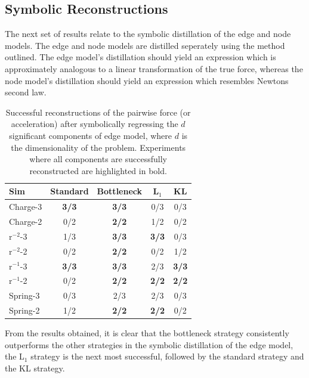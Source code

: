 \documentclass[11pt]{article}
\begin{document}
\subsection{Symbolic Reconstructions}
The next set of results relate to the symbolic distillation of the edge and node models. The edge and node models are distilled seperately using the method outlined. The edge model's distillation should yield an expression which is approximately analogous to a linear transformation of the true force, whereas the node model's distillation should yield an expression which resembles Newtons second law.
\begin{table}[H]
        \centering
        \begin{tabular}{lcccc}
        \hline
        Sim & Standard & Bottleneck & L$_1$ & KL \\
        \hline
        Charge-3 & \textbf{3/3} & \textbf{3/3} & 0/3 & 0/3 \\
        Charge-2 & 0/2 & \textbf{2/2} & 1/2 & 0/2 \\
        r$^{-2}$-3 & 1/3 & \textbf{3/3} & \textbf{3/3} & 0/3 \\
        r$^{-2}$-2 & 0/2 & \textbf{2/2} & 0/2 & 1/2 \\
        r$^{-1}$-3 & \textbf{3/3} & \textbf{3/3} & 2/3 & \textbf{3/3} \\
        r$^{-1}$-2 & 0/2 & \textbf{2/2} & \textbf{2/2} & \textbf{2/2} \\
        Spring-3 & 0/3 & 2/3 & 2/3  & 0/3 \\
        Spring-2 & 1/2 & \textbf{2/2} & \textbf{2/2} & 0/2 \\
        \hline
        \end{tabular}
        \caption{Successful reconstructions of the pairwise force (or acceleration) after symbolically regressing the $d$ significant components of edge model, where $d$ is the dimensionality of the problem. Experiments where all components are successfully reconstructed are highlighted in bold.}
        \label{tab:sr_edge_model_table}
    \end{table}
From the results obtained, it is clear that the bottleneck strategy consistently outperforms the other strategies in the symbolic distillation of the edge model, the L$_1$ strategy is the next most successful, followed by the standard strategy and the KL strategy.
\end{document}
